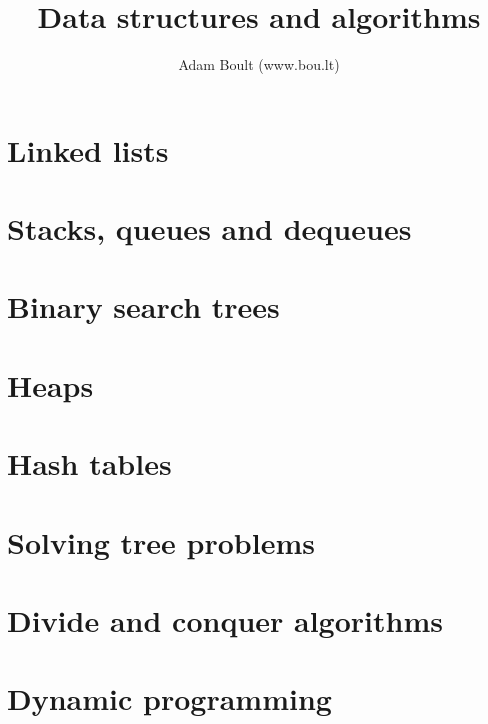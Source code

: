 \documentclass[oneside]{book}
\begin{document}
\author{Adam Boult (www.bou.lt)}
\title{Data structures and algorithms}
\maketitle

\setcounter{tocdepth}{0}
\tableofcontents



\part{Linked lists}



\part{Stacks, queues and dequeues}




\part{Binary search trees}



\part{Heaps}



\part{Hash tables}


\part{Solving tree problems}







\part{Divide and conquer algorithms}


\part{Dynamic programming}


\end{document}
